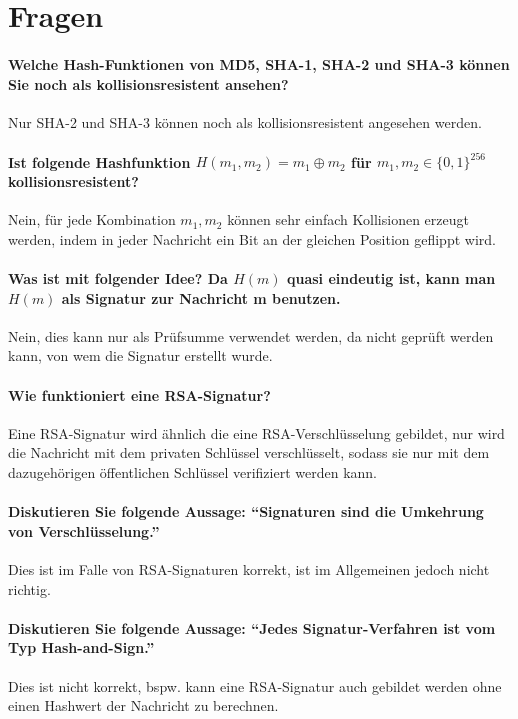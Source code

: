     \section{Fragen}
			\paragraph{Welche Hash-Funktionen von MD5, SHA-1, SHA-2 und SHA-3 können Sie noch als kollisionsresistent ansehen?}
			Nur SHA-2 und SHA-3 können noch als kollisionsresistent angesehen werden.
			
			\paragraph{Ist folgende Hashfunktion \( H(m_1, m_2) = m_1 \oplus m_2 \) für \( m_1, m_2 \in \{0, 1\}^{256} \) kollisionsresistent?}
			Nein, für jede Kombination \( m_1, m_2 \) können sehr einfach Kollisionen erzeugt werden, indem in jeder Nachricht ein Bit an der gleichen Position geflippt wird.
			
			\paragraph{Was ist mit folgender Idee? Da \(H(m)\) quasi eindeutig ist, kann man \(H(m)\) als Signatur zur Nachricht m benutzen.}
			Nein, dies kann nur als Prüfsumme verwendet werden, da nicht geprüft werden kann, von wem die Signatur erstellt wurde.
			
			\paragraph{Wie funktioniert eine RSA-Signatur?}
			Eine RSA-Signatur wird ähnlich die eine RSA-Verschlüsselung gebildet, nur wird die Nachricht mit dem privaten Schlüssel verschlüsselt, sodass sie nur mit dem dazugehörigen öffentlichen Schlüssel verifiziert werden kann.
			
			\paragraph{Diskutieren Sie folgende Aussage: \enquote{Signaturen sind die Umkehrung von Verschlüsselung.}}
			Dies ist im Falle von RSA-Signaturen korrekt, ist im Allgemeinen jedoch nicht richtig.
			
			\paragraph{Diskutieren Sie folgende Aussage: \enquote{Jedes Signatur-Verfahren ist vom Typ Hash-and-Sign.}}
			Dies ist nicht korrekt, bspw. kann eine RSA-Signatur auch gebildet werden ohne einen Hashwert der Nachricht zu berechnen.
			
